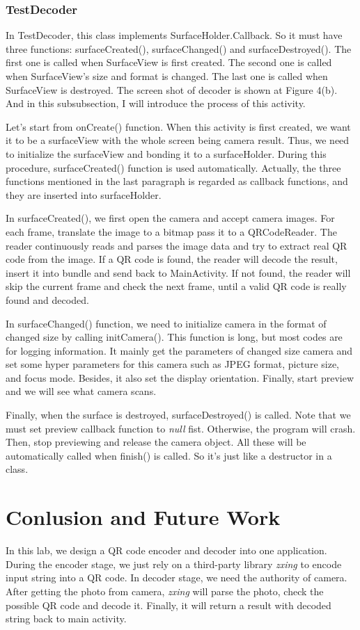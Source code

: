 \documentclass{article}
\begin{document}
\subsubsection{TestDecoder}
In TestDecoder, this class implements SurfaceHolder.Callback. So it must have three functions: surfaceCreated(), surfaceChanged() and surfaceDestroyed(). The first one is called when SurfaceView is first created. The second one is called when SurfaceView's size and format is changed. The last one is called when SurfaceView is destroyed. The screen shot of decoder is shown at Figure 4(b). And in this subsubsection, I will introduce the process of this activity.

Let's start from onCreate() function. When this activity is first created, we want it to be a surfaceView with the whole screen being camera result. Thus, we need to initialize the surfaceView and bonding it to a surfaceHolder. During this procedure, surfaceCreated() function is used automatically. Actually, the three functions mentioned in the last paragraph is regarded as callback functions, and they are inserted into surfaceHolder.

In surfaceCreated(), we first open the camera and accept camera images. For each frame, translate the image to a bitmap pass it to a QRCodeReader. The reader continuously reads and parses the image data and try to extract real QR code from the image. If a QR code is found, the reader will decode the result, insert it into bundle and send back to MainActivity. If not found, the reader will skip the current frame and check the next frame, until a valid QR code is really found and decoded.

In surfaceChanged() function, we need to initialize camera in the format of changed size by calling initCamera(). This function is long, but most codes are for logging information. It mainly get the parameters of changed size camera and set some hyper parameters for this camera such as JPEG format, picture size, and focus mode. Besides, it also set the display orientation. Finally, start preview and we will see what camera scans.

Finally, when the surface is destroyed, surfaceDestroyed() is called. Note that we must set preview callback function to \textit{null} fist. Otherwise, the program will crash. Then, stop previewing and release the camera object. All these will be automatically called when finish() is called. So it's just like a destructor in a class.

\section{Conlusion and Future Work}
In this lab, we design a QR code encoder and decoder into one application. During the encoder stage, we just rely on a third-party library \textit{zxing} to encode input string into a QR code. In decoder stage, we need the authority of camera. After getting the photo from camera, \textit{zxing} will parse the photo, check the possible QR code and decode it. Finally, it will return a result with decoded string back to main activity.
\end{document}
